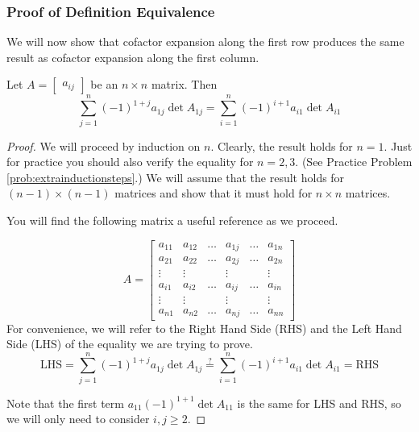 \documentclass{ximera}
\begin{document}
\subsubsection*{Proof of Definition Equivalence}
We will now show that cofactor expansion along the first row produces the same result as cofactor expansion along the first column.
\begin{theorem}\label{th:rowcolexpequivalence}
Let $A=\begin{bmatrix}a_{ij}\end{bmatrix}$ be an $n\times n$ matrix.  Then
$$\sum_{j=1}^n(-1)^{1+j}a_{1j}\det{A_{1j}}=\sum_{i=1}^n(-1)^{i+1}a_{i1}\det{A_{i1}}$$
\end{theorem}
\begin{proof}
We will proceed by induction on $n$.  Clearly, the result holds for $n=1$.  Just for practice you should also verify the equality for $n=2, 3$. (See Practice Problem \ref{prob:extrainductionsteps}.)  We will assume that the result holds for $(n-1)\times (n-1)$ matrices and show that it must hold for $n\times n$ matrices.

You will find the following matrix a useful reference as we proceed.

$$A=\begin{bmatrix}a_{11} & a_{12} & \dots &  a_{1j} &  \dots & a_{1n}  \\
    a_{21} & a_{22} & \dots &  a_{2j} &  \dots & a_{2n}  \\
   \vdots & \vdots &  & \vdots &   & \vdots  \\
  a_{i1} & a_{i2} & \ldots &  a_{ij} &  \ldots & a_{in}\\
  \vdots & \vdots &  & \vdots &   & \vdots  \\
   a_{n1} & a_{n2} & \dots &  a_{nj} &  \dots & a_{nn}\end{bmatrix}$$
   For convenience, we will refer to the Right Hand Side (RHS) and the Left Hand Side (LHS) of the equality we are trying to prove.
   $$\text{LHS}=\sum_{j=1}^n(-1)^{1+j}a_{1j}\det{A_{1j}}\overset{?}{=}\sum_{i=1}^n(-1)^{i+1}a_{i1}\det{A_{i1}}=\text{RHS}$$
   
   Note that the first term $a_{11}(-1)^{1+1}\det{A_{11}}$ is the same for LHS and RHS, so we will only need to consider $i,j\geq 2$.
   

\end{proof}
\end{document}
